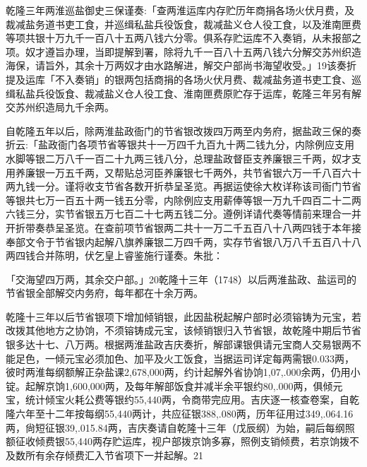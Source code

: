 乾隆三年两淮巡盐御史三保谨奏:「查两淮运库内存贮历年商捐各场火伏月费，及裁减盐务道书吏工食，并巡缉私盐兵役饭食，裁减盐义仓人役工食，以及淮南匣费等项共银十万九千一百八十五两八钱六分零。俱系存贮运库不入奏销，从未报部之项。奴才遵旨办理，当即提解到署，除将九千一百八十五两八钱六分解交苏州织造海保，请旨外，其余十万两奴才由水路解进，解交户部尚书海望收受。」19该奏折提及运库「不入奏销」的银两包括商捐的各场火伏月费、裁减盐务道书吏工食、巡缉私盐兵役饭食、裁减盐义仓人役工食、淮南匣费原贮存于运库，乾隆三年另有解交苏州织造局九千余两。

自乾隆五年以后，除两淮盐政衙门的节省银改拨四万两至内务府，据盐政三保的奏折云:「盐政衙门各项节省等银共十一万四千九百九十两二钱九分，内除例应支用水脚等银二万八千一百二十九两三钱八分，总理盐政督臣支养廉银三千两，奴才支用养廉银一万五千两，又帮贴总河臣养廉银七千两外，共节省银六万一千八百六十两九钱一分。谨将收支节省各数开折恭呈圣览。再据运使徐大枚详称该司衙门节省等银共七万一百五十两一钱五分零，内除例应支用薪俸等银一万九千四百二十二两六钱三分，实节省银五万七百二十七两五钱二分。遵例详请代奏等情前来理合一并开折带奏恭呈圣览。在查前项节省银两二共十一万二千五百八十八两四钱于本年接奉部文令于节省银内起解八旗养廉银二万四千两，实存节省银八万八千五百八十八两四钱合并陈明，伏乞皇上睿鉴施行谨奏。朱批：

\vfill
\begin{BookNotes}
\end{BookNotes}

\noindent 「交海望四万两，其余交户部。」20乾隆十三年（1748）以后两淮盐政、盐运司的节省银全部解交内务府，每年都在十余万两。

乾隆十三年以后节省银项下增加倾销银，此因盐税起解户部时必须镕铸为元宝，若改拨其他地方之协饷，不须镕铸成元宝，该倾销银归入节省银，故乾隆中期后节省银多达十七、八万两。根据两淮盐政吉庆奏折，解部课银俱请元宝商人交易银两不能足色，一倾元宝必须加色、加平及火工饭食，当据运司详定每两需银0.033两，彼时两淮每纲额解正杂盐课2,678,000两，约计起解外省协饷1,07,.000余两，仍用小锭。起解京饷1,600,000两，及每年解部饭食并减半余平银约80,.000两，俱倾元宝，统计倾宝火耗公费等银约55,440两，令商带完应用。吉庆逐一核查卷案，自乾隆六年至十二年按每纲55,440两计，共应征银388,.080两，历年征用过349,.064.16两，尙短征银39,.015.84两，吉庆奏请自乾隆十三年（戊辰纲）为始，嗣后每纲照额征收倾费银55,440两存贮运库，视户部拨京饷多寡，照例支销倾费，若京饷拨不及数所有余存倾费汇入节省项下一并起解。21


